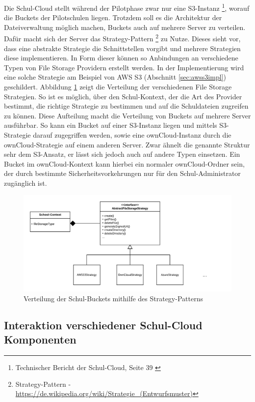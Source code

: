 Die Schul-Cloud stellt während der Pilotphase zwar nur eine S3-Instanz \footnote{Technischer Bericht der Schul-Cloud, Seite 39 \cite{paper:technischerbericht}}, worauf die Buckets der Pilotschulen liegen. Trotzdem soll es die Architektur der Dateiverwaltung möglich machen, Buckets auch auf mehrere Server zu verteilen. Dafür macht sich der Server das Strategy-Pattern \footnote{Strategy-Pattern - \url{https://de.wikipedia.org/wiki/Strategie_(Entwurfsmuster)}} zu Nutze. Dieses sieht vor, dass eine abstrakte Strategie die Schnittstellen vorgibt und mehrere Strategien diese implementieren. In Form dieser können so Anbindungen an verschiedene Typen von File Storage Providern erstellt werden. In der Implementierung wird eine solche Strategie am Beispiel von AWS S3 (Abschnitt \ref{sec:awss3impl}) geschildert. Abbildung \ref{fig:strategy} zeigt die Verteilung der verschiedenen File Storage Strategien. So ist es möglich, über den Schul-Kontext, der die Art des Provider bestimmt, die richtige Strategie zu bestimmen und auf die Schuldateien zugreifen zu können. Diese Aufteilung macht die Verteilung von Buckets auf mehrere Server ausführbar. So kann ein Bucket auf einer S3-Instanz liegen und mittels S3-Strategie darauf zugegriffen werden, sowie eine ownCloud-Instanz durch die ownCloud-Strategie auf einem anderen Server. Zwar ähnelt die genannte Struktur sehr dem S3-Ansatz, er lässt sich jedoch auch auf andere Typen einsetzen. Ein Bucket im ownCloud-Kontext kann hierbei ein normaler ownCloud-Ordner sein, der durch bestimmte Sicherheitsvorkehrungen nur für den Schul-Administrator zugänglich ist.

\begin{figure}[H]
	\centering
	\includegraphics[width=1\linewidth]{images/strategypattern}
	\caption[Caption for concept]{Verteilung der Schul-Buckets mithilfe des Strategy-Patterns}
	\label{fig:strategy}
\end{figure}

\subsection{Interaktion verschiedener Schul-Cloud Komponenten}
\label{sec:interactionconcept}

